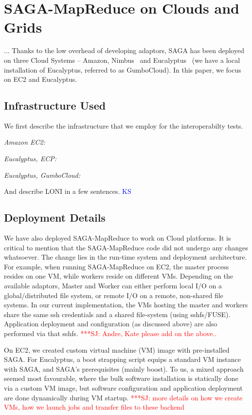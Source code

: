 \documentclass[conference,final]{IEEEtran}
\newcommand{\jhanote}[1]{ {\textcolor{red} { ***SJ: #1 }}}
\newcommand{\jhanote}[1]{}
\newcommand{\sagamapreduce }{SAGA-MapReduce }
\begin{document}
\section{SAGA-MapReduce on Clouds and Grids}

... Thanks to the low overhead of developing adaptors, SAGA has been
deployed on three Cloud Systems -- Amazon, Nimbus~\cite{nimbus} and
Eucalyptus~\cite{eucalyptus} (we have a local installation of
Eucalyptus, referred to as GumboCloud).  In this paper, we focus on
EC2 and Eucalyptus.


\subsection*{Infrastructure Used} We first describe the infrastructure
that we employ for the interoperabilty tests.

{\it Amazon EC2:}

{\it Eucalyptus, ECP:}

{\it Eucalyptus, GumboCloud:}

And describe LONI in a few sentences.  {\textcolor{blue}{KS}}


\subsection{Deployment Details}

We have also deployed \sagamapreduce to work on Cloud platforms.  It
is critical to mention that the \sagamapreduce code did not undergo
any changes whatsoever. The change lies in the run-time system and
deployment architecture. For example, when running \sagamapreduce on
EC2, the master process resides on one VM, while workers reside on
different VMs.  Depending on the available adaptors, Master and Worker
can either perform local I/O on a global/distributed file system, or
remote I/O on a remote, non-shared file systems.  In our current
implementation, the VMs hosting the master and workers share the same
ssh credentials and a shared file-system (using sshfs/FUSE).
Application deployment and configuration (as discussed above) are also
performed via that sshfs.  \jhanote{Andre, Kate please add on the
  above..}

On EC2, we created custom virtual machine (VM) image with
pre-installed SAGA.  For Eucalyptus, a boot strapping script equips a
standard VM instance with SAGA, and SAGA's prerequisites (mainly
boost).  To us, a mixed approach seemed most favourable, where the
bulk software installation is statically done via a custom VM image,
but software configuration and application deployment are done
dynamically during VM startup.  \jhanote{more details on how we create
  VMs, how we launch jobs and transfer files to these backend}
\end{document}
